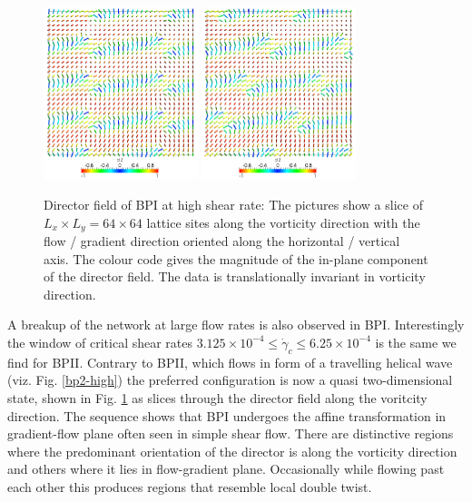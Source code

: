 \documentclass[aps,pre,reprint,superscriptaddress, twocolumn]{revtex4}
\newcommand{\e}[1]{\times10^{#1}}
\newcommand{\gd}{\dot{\gamma}}
\begin{document}
\begin{figure}[htpb]
\includegraphics[width=0.4\textwidth]{dir+z-301k_run916.png}
\includegraphics[width=0.4\textwidth]{dir+z-302k_run916.png}
\caption{Director field of BPI at high shear rate: The pictures show a slice of $L_x\times L_y = 64\times64$ lattice sites along the vorticity direction with the flow / gradient direction oriented along the horizontal / vertical axis. The colour code gives the magnitude of the in-plane component of the director field. The data is translationally invariant in vorticity direction.}
\label{bp1-high}
\end{figure}
 
A breakup of the network at large flow rates is also observed
in BPI. Interestingly the window of critical shear rates 
$3.125\e{-4}\le\gd_c\le 6.25\e{-4}$  is the same we find for BPII.  
Contrary to BPII, which flows in form of a travelling helical wave
(viz. Fig. \ref{bp2-high}) the preferred configuration is now
a quasi two-dimensional state, shown in Fig. \ref{bp1-high} as 
slices through the director field along the voritcity direction.      
The sequence shows that BPI undergoes the affine transformation 
in gradient-flow plane often seen in simple shear flow.
There are distinctive regions where the predominant orientation 
of the director is along the vorticity direction and others
where it lies in flow-gradient plane. Occasionally while 
flowing past each other this produces regions that 
resemble local double twist.
\end{document}
